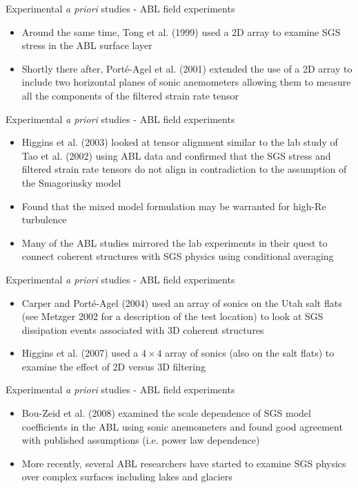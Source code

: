 \begin{frame}{Experimental {\it a priori} studies - ABL field experiments}
\begin{itemize}
	\item Around the same time, Tong et al. (1999) used a 2D array to examine SGS stress in the ABL surface layer
	\item Shortly there after, Port\'e-Agel et al. (2001) extended the use of a 2D array to include two horizontal planes of sonic anemometers allowing them to measure all the components of the filtered strain rate tensor
	\end{itemize}
\end{frame}

\begin{frame}{Experimental {\it a priori} studies - ABL field experiments}
\begin{itemize}
	\item Higgins et al. (2003) looked at tensor alignment similar to the lab study of Tao et al. (2002) using ABL data and confirmed that the SGS stress and filtered strain rate tensors do not align in contradiction to the assumption of the Smagorinsky model
	\item Found that the mixed model formulation may be warranted for high-Re turbulence
	\item Many of the ABL studies mirrored the lab experiments in their quest to connect coherent structures with SGS physics using conditional averaging
	\end{itemize}
\end{frame}

\begin{frame}{Experimental {\it a priori} studies - ABL field experiments}
\begin{itemize}
	\item Carper and Port\'e-Agel (2004) used an array of sonics on the Utah salt flats (see Metzger 2002 for a description of the test location) to look at SGS dissipation events associated with 3D coherent structures
	\item Higgins et al. (2007) used a $4\times 4$ array of sonics (also on the salt flats) to examine the effect of 2D versus 3D filtering
	\end{itemize}
\end{frame}

\begin{frame}{Experimental {\it a priori} studies - ABL field experiments}
\begin{itemize}
	\item Bou-Zeid et al. (2008) examined the scale dependence of SGS model coefficients in the ABL using sonic anemometers and found good agreement with published assumptions (i.e. power law dependence)
	\item More recently, several ABL researchers have started to examine SGS physics over complex surfaces including lakes and glaciers
	\end{itemize}
\end{frame}

